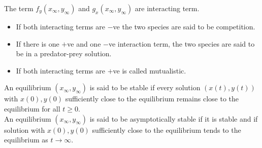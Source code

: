 \documentclass[../main-sheet.tex]{subfiles}
\begin{document}
\begin{soln}
\begin{enumerate}[label=(\roman*)]
        The term \(f_y(x_\infty, y_\infty)\) and \(g_x(x_\infty, y_\infty)\) are interacting term.
        \begin{itemize}
            \item If both interacting terms are \(-\)ve the two species are said to be competition.
            \item If there is one \(+\)ve and one \(-\)ve interaction term, the two species are said to be in a predator-prey solution.
            \item If both interacting terms are \(+\)ve is called mutualistic.
        \end{itemize}
    \end{enumerate}
\end{soln}


An equilibrium \((x_\infty, y_\infty)\) is said to be stable if every solution \((x(t),y(t))\) with \(x(0),y(0)\) sufficiently close to the equilibrium remains close to the equilibrium for all \(t\geq0\).\\


An equilibrium \((x_\infty, y_\infty)\) is said to be asymptotically stable if it is stable and if solution with \(x(0),y(0)\) sufficiently close to the equilibrium tends to the equilibrium as \(t\to \infty\).
\end{document}
